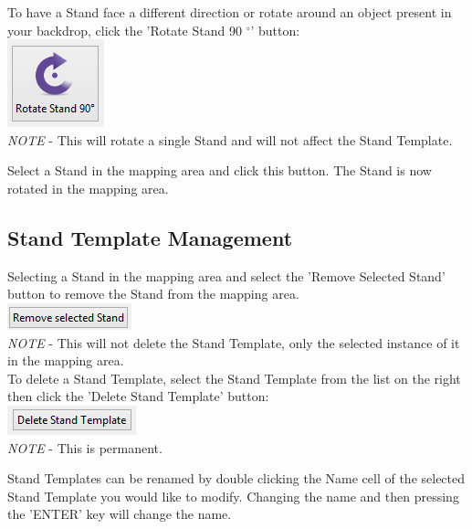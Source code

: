 \documentclass{report}
\begin{document}
 To have a Stand face a different direction or rotate around an object present in 
your backdrop,  click the 'Rotate Stand 90 $^{\circ}$' button:\\

\includegraphics{rotatestandbutton.png}\\

\emph{NOTE} - This will rotate a single Stand and will not affect the Stand Template.

Select a Stand in the mapping area and click this button. The Stand is now rotated 
in the mapping area.

\subsection{Stand Template Management}
Selecting a Stand in the mapping area and select the 'Remove Selected Stand' button to
remove the Stand from the mapping area.\\

\includegraphics{removestandbutton.png}\\

\emph{NOTE} - This will not delete the Stand Template, only the selected instance of it in the 
mapping area.\\

To delete a Stand Template, select the Stand Template from 
the list on the right then click the 'Delete Stand Template' button:\\

\includegraphics{deletestandtemplatebutton.png}\\

\emph{NOTE} - This is permanent.

Stand Templates can be renamed by double clicking the Name cell of the selected Stand 
Template you would like to modify.  Changing the name and then pressing the 'ENTER' 
key will change the name.\\
\end{document}

